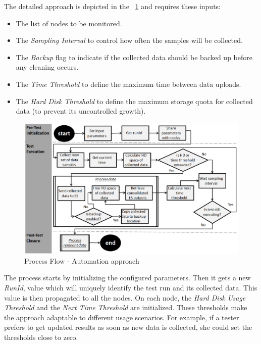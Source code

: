 \documentclass[runningheads,a4paper]{llncs}
\begin{document}
The detailed approach is depicted in the \figurename
~\ref{fig_ApproachDiagram} and requires these inputs: 
\vspace{-7pt}
\begin{itemize}
	\item The list of nodes to be monitored.
	\item The \emph{Sampling Interval} to control how often the samples will be
	collected.
	\item The \emph{Backup} flag to indicate if the collected data should be backed
	up before any cleaning occurs.
	\item The \emph{Time Threshold} to define the maximum time between data
	uploads.
	\item The \emph{Hard Disk Threshold} to define the maximum storage quota for
	collected data (to prevent its uncontrolled growth).
\end{itemize}

\begin{figure}[!h]
\centering
\includegraphics[totalheight=.35\textheight,width=1.0\textwidth]{ApproachDiagram}
\caption{Process Flow - Automation approach}
\label{fig_ApproachDiagram}
\end{figure}

The process starts
by initializing the
configured parameters. Then it gets a new \emph{RunId}, value which will
uniquely identify the test run and its collected data. This value is then
propagated to all the nodes. On each node, the \emph{Hard Disk Usage Threshold} and  
the \emph{Next Time Threshold} are initialized. These
thresholds make the approach adaptable to different usage scenarios. For
example, if a tester prefers to get updated results as soon as new data is
collected, she could set the thresholds close to zero.
\end{document}
